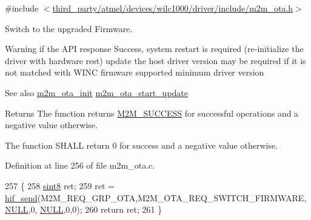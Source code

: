 {\ttfamily \#include $<$\hyperlink{m2m__ota_8h}{third\+\_\+party/atmel/devices/wilc1000/driver/include/m2m\+\_\+ota.\+h}$>$}



Switch to the upgraded Firmware. 

\begin{DoxyWarning}{Warning}
if the A\+PI response Success, system restart is required (re-\/initialize the driver with hardware rest) update the host driver version may be required if it is not matched with W\+I\+NC firmware supported minimum driver version 
\end{DoxyWarning}
\begin{DoxySeeAlso}{See also}
\hyperlink{group__OtaInitFn_gacd2a1a8ffaccc3deb1970cf1ad41ceec}{m2m\+\_\+ota\+\_\+init} \hyperlink{group__OtaStartUpdatefn_gac50387eab16b3257f1c037942f2682fd}{m2m\+\_\+ota\+\_\+start\+\_\+update}
\end{DoxySeeAlso}
\begin{DoxyReturn}{Returns}
The function returns \hyperlink{nm__common_8h_a9ef27ba27aafdd1aa3a79d3ba2c36b8f}{M2\+M\+\_\+\+S\+U\+C\+C\+E\+SS} for successful operations and a negative value otherwise.

The function S\+H\+A\+LL return 0 for success and a negative value otherwise. 
\end{DoxyReturn}


Definition at line 256 of file m2m\+\_\+ota.\+c.


\begin{DoxyCode}
257 \{
258     \hyperlink{group__DataT_gae35f10ffd0ac8dd2bc3e794da9bdfbc7}{sint8} ret;
259     ret = \hyperlink{m2m__hif_8c_a13ba8ad11b2ac39516ca787386d16ce0}{hif\_send}(M2M\_REQ\_GRP\_OTA,M2M\_OTA\_REQ\_SWITCH\_FIRMWARE,\hyperlink{group__BSPDefine_ga070d2ce7b6bb7e5c05602aa8c308d0c4}{NULL},0,
      \hyperlink{group__BSPDefine_ga070d2ce7b6bb7e5c05602aa8c308d0c4}{NULL},0,0);
260     \textcolor{keywordflow}{return} ret;
261 \}
\end{DoxyCode}

